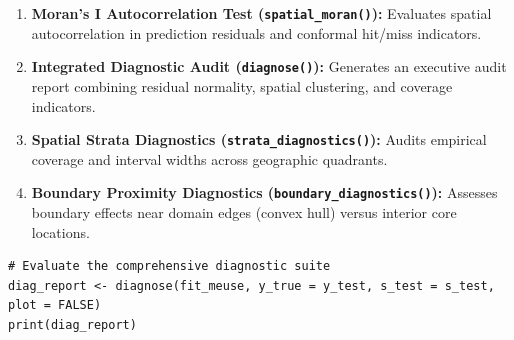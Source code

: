 \begin{enumerate}
\def\labelenumi{\arabic{enumi}.}
\tightlist
\item
  \textbf{Moran's I Autocorrelation Test (\texttt{spatial\_moran()}):} Evaluates spatial autocorrelation in prediction residuals and conformal hit/miss indicators.
\item
  \textbf{Integrated Diagnostic Audit (\texttt{diagnose()}):} Generates an executive audit report combining residual normality, spatial clustering, and coverage indicators.
\item
  \textbf{Spatial Strata Diagnostics (\texttt{strata\_diagnostics()}):} Audits empirical coverage and interval widths across geographic quadrants.
\item
  \textbf{Boundary Proximity Diagnostics (\texttt{boundary\_diagnostics()}):} Assesses boundary effects near domain edges (convex hull) versus interior core locations.
\end{enumerate}

\begin{verbatim}
# Evaluate the comprehensive diagnostic suite
diag_report <- diagnose(fit_meuse, y_true = y_test, s_test = s_test, plot = FALSE)
print(diag_report)
\end{verbatim}

